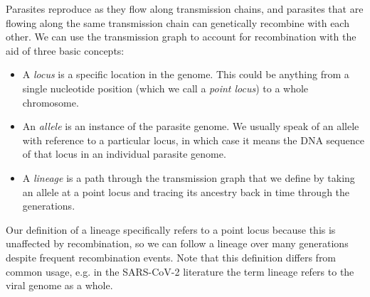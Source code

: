 \documentclass[_main.tex]{subfiles}
\begin{document}


Parasites reproduce as they flow along transmission chains, and parasites that are flowing along the same transmission chain can genetically recombine with each other. We can use the transmission graph to account for recombination with the aid of three basic concepts:

\begin{itemize}[noitemsep]

\item A \textit{locus} is a specific location in the genome.  This could be anything from a single nucleotide position (which we call a \textit{point locus}) to a whole chromosome.

\item  An \textit{allele} is an instance of the parasite genome.  We usually speak of an allele with reference to a particular locus, in which case it means the DNA sequence of that locus in an individual parasite genome.

\item A \textit{lineage} is a path through the transmission graph that we define by taking an allele at a point locus and tracing its ancestry back in time through the generations. 

\end{itemize}

Our definition of a lineage specifically refers to a point locus because this is unaffected by recombination, so we can follow a lineage over many generations despite frequent recombination events.  Note that this definition differs from common usage, e.g. in the SARS-CoV-2 literature the term lineage refers to the viral genome as a whole. 
\end{document}
